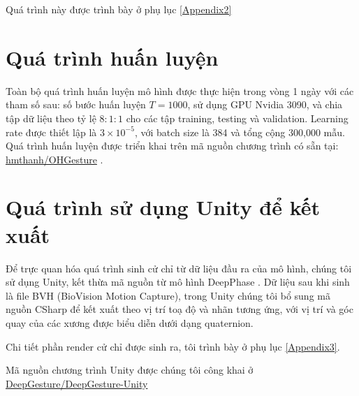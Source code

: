 Quá trình này được trình bày ở phụ lục \ref{Appendix2}

\section{Quá trình huấn luyện}

Toàn bộ quá trình huấn luyện mô hình được thực hiện trong vòng 1 ngày với các tham số sau: số bước huấn luyện $T = 1000$, sử dụng GPU Nvidia 3090, và chia tập dữ liệu theo tỷ lệ $8:1:1$ cho các tập training, testing và validation. Learning rate được thiết lập là $3 \times 10^{-5}$, với batch size là 384 và tổng cộng 300,000 mẫu. Quá trình huấn luyện được triển khai trên mã nguồn chương trình có sẵn tại: \hyperlink{https://github.com/hmthanh/OHGesture}{hmthanh/OHGesture} .


\section{Quá trình sử dụng Unity để kết xuất}

Để trực quan hóa quá trình sinh cử chỉ từ dữ liệu đầu ra của mô hình, chúng tôi sử dụng Unity, kết thừa mã nguồn từ mô hình DeepPhase \cite{starke2022deepphase}  . Dữ liệu sau khi sinh là file BVH (BioVision Motion Capture), trong Unity chúng tôi bổ sung mã nguồn CSharp để kết xuất theo vị trí toạ độ và nhãn tương ứng, với vị trí và góc quay của các xương được biểu diễn dưới dạng quaternion.

Chi tiết phần render cử chỉ được sinh ra, tôi trình bày ở phụ lục \ref{Appendix3}.

Mã nguồn chương trình Unity được chúng tôi công khai ở \hyperlink{https://github.com/DeepGesture/deepgesture-unity}{DeepGesture/DeepGesture-Unity}